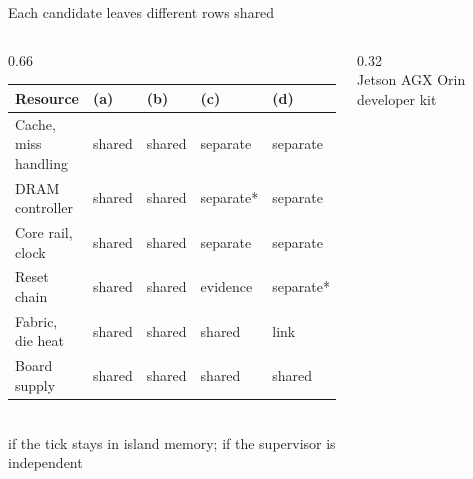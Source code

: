 \documentclass[aspectratio=169, 12pt]{beamer}
\begin{document}
\begin{frame}{Each candidate leaves different rows shared}
  \begin{columns}[c]
    \begin{column}{0.66\textwidth}
      \footnotesize
      \begin{tabular}{@{}l>{\centering\arraybackslash}p{0.95cm}>{\centering\arraybackslash}p{0.95cm}>{\centering\arraybackslash}p{1.4cm}>{\centering\arraybackslash}p{1.4cm}@{}}\toprule
        \textbf{Resource} & \textbf{(a)} & \textbf{(b)} & \textbf{(c)} & \textbf{(d)}\\\midrule
        Cache, miss handling & \textcolor{vred}{shared} & \textcolor{vred}{shared} & separate & separate\\
        DRAM controller & \textcolor{vred}{shared} & \textcolor{vred}{shared} & separate* & separate\\
        Core rail, clock & \textcolor{vred}{shared} & \textcolor{vred}{shared} & separate & separate\\
        Reset chain & \textcolor{vred}{shared} & \textcolor{vred}{shared} & \textcolor{vamber}{evidence} & separate*\\
        Fabric, die heat & \textcolor{vred}{shared} & \textcolor{vred}{shared} & \textcolor{vred}{shared} & link\\
        Board supply & \textcolor{vred}{shared} & \textcolor{vred}{shared} & \textcolor{vred}{shared} & \textcolor{vred}{shared}\\\bottomrule
      \end{tabular}\\[0.05cm]
      {\scriptsize * if the tick stays in island memory; if the supervisor is independent}\\[0.08cm]
    \end{column}
    \begin{column}{0.32\textwidth}
      \centering{}\\[0.05cm]
      {\footnotesize Jetson AGX Orin developer kit}
    \end{column}
  \end{columns}
\end{frame}
\end{document}
